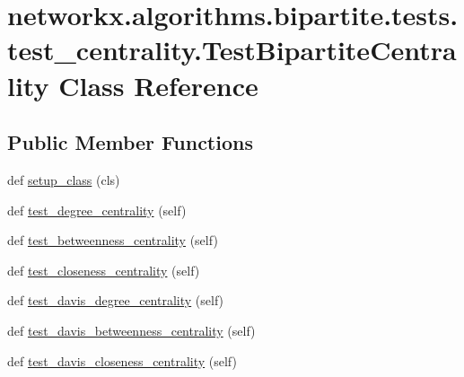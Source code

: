 \hypertarget{classnetworkx_1_1algorithms_1_1bipartite_1_1tests_1_1test__centrality_1_1TestBipartiteCentrality}{}\section{networkx.\+algorithms.\+bipartite.\+tests.\+test\+\_\+centrality.\+Test\+Bipartite\+Centrality Class Reference}
\label{classnetworkx_1_1algorithms_1_1bipartite_1_1tests_1_1test__centrality_1_1TestBipartiteCentrality}
\subsection*{Public Member Functions}
\begin{DoxyCompactItemize}
\item 
def \hyperlink{classnetworkx_1_1algorithms_1_1bipartite_1_1tests_1_1test__centrality_1_1TestBipartiteCentrality_a72d18268d1f9e6a2e2cf262b4efe2ccc}{setup\+\_\+class} (cls)
\item 
def \hyperlink{classnetworkx_1_1algorithms_1_1bipartite_1_1tests_1_1test__centrality_1_1TestBipartiteCentrality_ae0099170a87f2d54df2f3ae3b20b7372}{test\+\_\+degree\+\_\+centrality} (self)
\item 
def \hyperlink{classnetworkx_1_1algorithms_1_1bipartite_1_1tests_1_1test__centrality_1_1TestBipartiteCentrality_afc6be7819ed73e4980bc5d9964c17ffd}{test\+\_\+betweenness\+\_\+centrality} (self)
\item 
def \hyperlink{classnetworkx_1_1algorithms_1_1bipartite_1_1tests_1_1test__centrality_1_1TestBipartiteCentrality_aaa6eae848d5acccc1dd3e4797ac44ac6}{test\+\_\+closeness\+\_\+centrality} (self)
\item 
def \hyperlink{classnetworkx_1_1algorithms_1_1bipartite_1_1tests_1_1test__centrality_1_1TestBipartiteCentrality_a3f9a0fb98a662d696ba39751d91e07cd}{test\+\_\+davis\+\_\+degree\+\_\+centrality} (self)
\item 
def \hyperlink{classnetworkx_1_1algorithms_1_1bipartite_1_1tests_1_1test__centrality_1_1TestBipartiteCentrality_a3a32718d03a0dd7f25b08019d0660fee}{test\+\_\+davis\+\_\+betweenness\+\_\+centrality} (self)
\item 
def \hyperlink{classnetworkx_1_1algorithms_1_1bipartite_1_1tests_1_1test__centrality_1_1TestBipartiteCentrality_aea8040c704a9500dd18697e1448bd165}{test\+\_\+davis\+\_\+closeness\+\_\+centrality} (self)
\end{DoxyCompactItemize}
